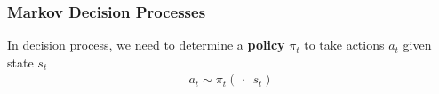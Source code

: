     


\subsubsection{Markov Decision Processes}
In decision process, we need to determine a \textbf{policy} $ \pi_t $ to take actions $ a_t $ given state $ s_t $
\begin{align*}
    a_t\sim \pi_t(\, \cdot \,| s_t) 
\end{align*}

 








     




    










 












   


